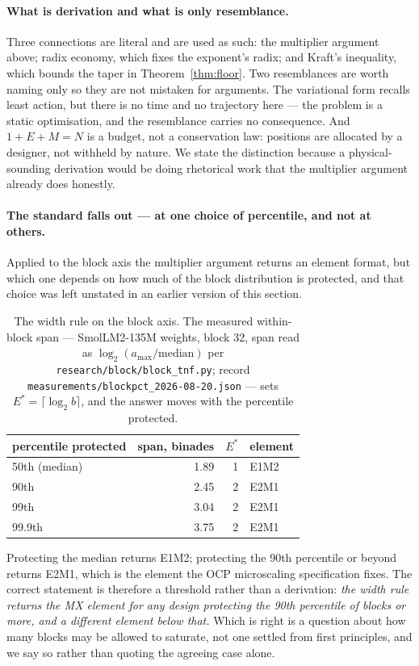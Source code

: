 \documentclass[11pt]{article}
\theoremstyle{definition}
\begin{document}
\paragraph{What is derivation and what is only resemblance.} Three connections are
literal and are used as such: the multiplier argument above; radix economy, which
fixes the exponent's radix; and Kraft's inequality, which bounds the taper in
Theorem~\ref{thm:floor}. Two resemblances are worth naming only so they are not
mistaken for arguments. The variational form recalls least action, but there is no
time and no trajectory here --- the problem is a static optimisation, and the
resemblance carries no consequence. And $1+E+M=N$ is a budget, not a conservation
law: positions are allocated by a designer, not withheld by nature. We state the
distinction because a physical-sounding derivation would be doing rhetorical work
that the multiplier argument already does honestly.

\paragraph{The standard falls out --- at one choice of percentile, and not at
others.} Applied to the block axis the multiplier argument returns an element
format, but which one depends on how much of the block distribution is protected,
and that choice was left unstated in an earlier version of this section.

\begin{table}[t]\centering
\caption{The width rule on the block axis. The measured within-block span ---
SmolLM2-135M weights, block 32, span read as $\log_2(a_{\max}/\mathrm{median})$
per \texttt{research/block/block\_tnf.py}; record
\texttt{measurements/blockpct\_2026-08-20.json} --- sets
$E^{*} = \lceil \log_2 b \rceil$, and the answer moves with the percentile
protected.}
\label{tab:blockpct}
\begin{tabular}{lrrl}
\toprule
percentile protected & span, binades & $E^{*}$ & element \\
\midrule
50th (median) & 1.89 & 1 & E1M2 \\
90th & 2.45 & 2 & E2M1 \\
99th & 3.04 & 2 & E2M1 \\
99.9th & 3.75 & 2 & E2M1 \\
\bottomrule
\end{tabular}
\end{table}

Protecting the median returns E1M2; protecting the 90th percentile or beyond
returns E2M1, which is the element the OCP microscaling specification fixes. The
correct statement is therefore a threshold rather than a derivation: \emph{the
width rule returns the MX element for any design protecting the 90th percentile
of blocks or more, and a different element below that.} Which is right is a
question about how many blocks may be allowed to saturate, not one settled from
first principles, and we say so rather than quoting the agreeing case alone.
\end{document}
